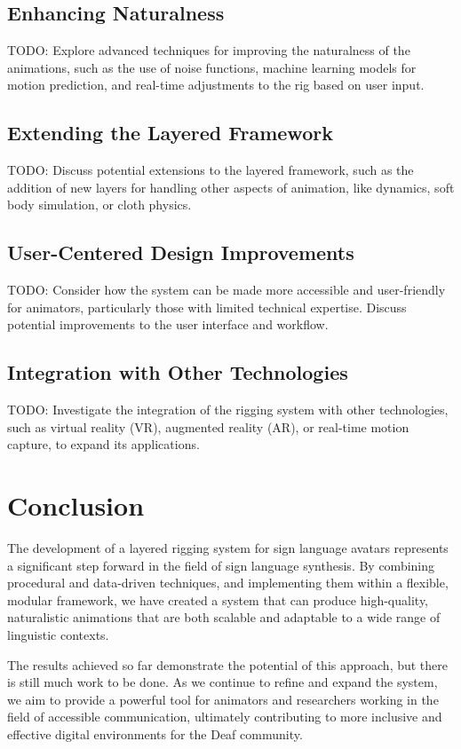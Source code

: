 \documentclass[../../main.tex]{subfiles}
\begin{document}
\subsection{Enhancing Naturalness}
TODO: Explore advanced techniques for improving the naturalness of the animations, such as the use of noise functions, machine learning models for motion prediction, and real-time adjustments to the rig based on user input.

\subsection{Extending the Layered Framework}
TODO: Discuss potential extensions to the layered framework, such as the addition of new layers for handling other aspects of animation, like dynamics, soft body simulation, or cloth physics.

\subsection{User-Centered Design Improvements}
TODO: Consider how the system can be made more accessible and user-friendly for animators, particularly those with limited technical expertise. Discuss potential improvements to the user interface and workflow.

\subsection{Integration with Other Technologies}
TODO: Investigate the integration of the rigging system with other technologies, such as virtual reality (VR), augmented reality (AR), or real-time motion capture, to expand its applications.

\section{Conclusion}
The development of a layered rigging system for sign language avatars represents a significant step forward in the field of sign language synthesis. By combining procedural and data-driven techniques, and implementing them within a flexible, modular framework, we have created a system that can produce high-quality, naturalistic animations that are both scalable and adaptable to a wide range of linguistic contexts.

The results achieved so far demonstrate the potential of this approach, but there is still much work to be done. As we continue to refine and expand the system, we aim to provide a powerful tool for animators and researchers working in the field of accessible communication, ultimately contributing to more inclusive and effective digital environments for the Deaf community.
\end{document}
